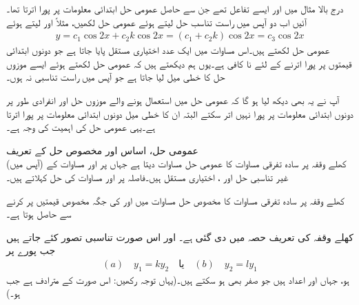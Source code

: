 درج بالا مثال میں  اور  ایسے تفاعل تھے جن سے حاصل عمومی حل ابتدائی معلومات پر پورا اترتا تھا۔آئیں اب دو آپس میں راست تناسب حل لیتے ہوئے عمومی حل  لکھیں، مثلاً  اور  لیتے ہوئے
\begin{align*}
y=c_1\cos 2x+c_2 k\cos 2x=(c_1+c_2k)\cos 2x=c_3\cos 2x
\end{align*}
عمومی حل لکھتے ہیں۔اس مساوات میں ایک عدد اختیاری مستقل  پایا جاتا ہے جو دونوں ابتدائی قیمتوں پر پورا اترنے کے لئے نا کافی ہے۔یوں ہم دیکھتے ہیں کہ عمومی حل لکھتے ہوئے ایسے موزوں حل کا خطی میل لیا جاتا ہے جو آپس میں راست تناسبی نہ ہوں۔

 آپ نے یہ بھی دیکھ لیا ہو گا کہ عمومی حل میں استعمال ہونے والے موزوں حل  اور  انفرادی طور پر دونوں ابتدائی معلومات پر پورا نہیں اتر سکتے البتہ ان کا خطی میل دونوں ابتدائی معلومات پر پورا اترتا ہے۔یہی عمومی حل کی اہمیت کی وجہ ہے۔

\quad عمومی حل، اساس اور مخصوص حل کے تعریف\\
کھلے وقفہ  پر سادہ تفرقی مساوات  کا عمومی حل مساوات  دیتا ہے جہاں  پر  اور  مساوات   کے  (آپس میں) غیر تناسبی حل اور ،  اختیاری مستقل ہیں۔فاصلہ  پر  اور  مساوات  کی  حل کہلاتے ہیں۔

کھلے وقفہ  پر سادہ تفرقی مساوات  کا مخصوص حل مساوات  میں  اور  کی جگہ مخصوص قیمتیں پر کرنے سے حاصل ہوتا ہے۔

کھلے وقفہ کی تعریف حصہ  میں دی گئی ہے۔  اور  اس صورت  تناسبی تصور کئے جاتے ہیں  جب پورے  پر
\begin{align}
(a)\quad y_1=ky_2 \quad \text{یا} \quad  (b) \quad y_2=ly_1
\end{align} 
ہو، جہاں  اور  اعداد ہیں جو صفر بھی ہو سکتے ہیں۔(یہاں توجہ رکھیں:  اس صورت  کے مترادف ہے جب  ہو۔)

